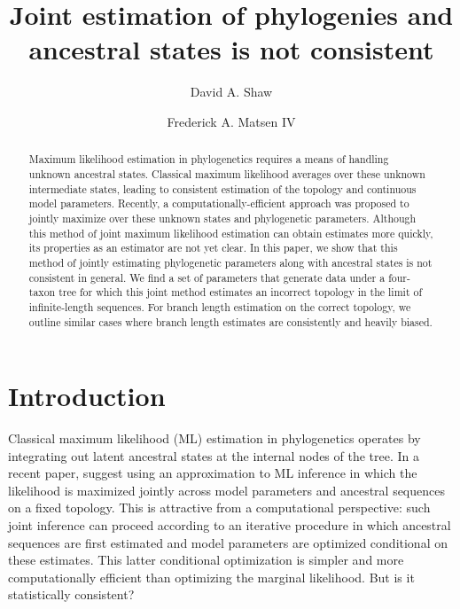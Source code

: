 \documentclass{article}
\title{Joint estimation of phylogenies and ancestral states is not consistent}
\author{David A. Shaw \and Frederick A. Matsen IV}
\begin{document}
\maketitle

\renewcommand{\arraystretch}{1.2} %

\begin{abstract}
Maximum likelihood estimation in phylogenetics requires a means of handling unknown ancestral states.
Classical maximum likelihood averages over these unknown intermediate states, leading to consistent estimation of the topology and continuous model parameters.
Recently, a computationally-efficient approach was proposed to jointly maximize over these unknown states and phylogenetic parameters.
Although this method of joint maximum likelihood estimation can obtain estimates more quickly, its properties as an estimator are not yet clear.
In this paper, we show that this method of jointly estimating phylogenetic parameters along with ancestral states is not consistent in general.
We find a set of parameters that generate data under a four-taxon tree for which this joint method estimates an incorrect topology in the limit of infinite-length sequences.
For branch length estimation on the correct topology, we outline similar cases where branch length estimates are consistently and heavily biased.
\end{abstract}

\section*{Introduction}

Classical maximum likelihood (ML) estimation in phylogenetics operates by integrating out latent ancestral states at the internal nodes of the tree.
In a recent paper, \cite{Sagulenko2017-jo} suggest using an approximation to ML inference in which the likelihood is maximized jointly across model parameters and ancestral sequences on a fixed topology.
This is attractive from a computational perspective: such joint inference can proceed according to an iterative procedure in which ancestral sequences are first estimated and model parameters are optimized conditional on these estimates.
This latter conditional optimization is simpler and more computationally efficient than optimizing the marginal likelihood.
But is it statistically consistent?
\end{document}
